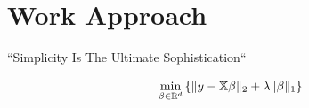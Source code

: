 \documentclass{tccv}
\begin{document}

\section{Work Approach}

``Simplicity Is The Ultimate Sophistication``

\vspace{0.1cm}

\begin{equation*}
  \min_{\beta \in \mathbb{R}^{d}}\left\{\|y - \mathbb{X}\beta \|_{2} + \lambda \|\beta \|_{1}\right\}\\
\end{equation*}


\vspace{0.1cm}





\end{document}
